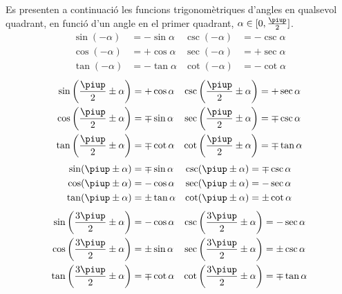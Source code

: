  Es presenten a continuació  les funcions trigonomètriques d'angles en qualsevol
quadrant, en funció d'un angle en el primer quadrant,
$\alpha\in[0,\frac{\piup}{2}]$.
\begin{subequations}
\begin{align}
    \sin(-\alpha) &= -\sin\alpha  & \csc(-\alpha) &= -\csc\alpha \\
    \cos(-\alpha) &= +\cos\alpha  & \sec(-\alpha) &= +\sec\alpha \\
    \tan(-\alpha) &= -\tan\alpha  & \cot(-\alpha) &= -\cot\alpha
\end{align}
\end{subequations}
\vspace{-5mm}
\begin{subequations}
\begin{align}
    \sin\left(\frac{\piup}{2}\pm\alpha\right) &= +\cos\alpha    & \csc\left(\frac{\piup}{2}\pm\alpha\right) &= +\sec\alpha \\
    \cos\left(\frac{\piup}{2}\pm\alpha\right) &= \mp\sin\alpha  & \sec\left(\frac{\piup}{2}\pm\alpha\right) &= \mp\csc\alpha \\
    \tan\left(\frac{\piup}{2}\pm\alpha\right) &= \mp\cot\alpha  & \cot\left(\frac{\piup}{2}\pm\alpha\right) &= \mp\tan\alpha
\end{align}
\end{subequations}
\vspace{-5mm}
\begin{subequations}
\begin{align}
    \sin(\piup\pm\alpha) &= \mp\sin\alpha  & \csc(\piup\pm\alpha) &= \mp\csc\alpha \\
    \cos(\piup\pm\alpha) &= -\cos\alpha    & \sec(\piup\pm\alpha) &= -\sec\alpha \\
    \tan(\piup\pm\alpha) &= \pm\tan\alpha  & \cot(\piup\pm\alpha) &= \pm\cot\alpha
\end{align}
\end{subequations}
\vspace{-5mm}
\begin{subequations}
\begin{align}
    \sin\left(\frac{3\piup}{2}\pm\alpha\right) &= -\cos\alpha    & \csc\left(\frac{3\piup}{2}\pm\alpha\right) &= -\sec\alpha \\
    \cos\left(\frac{3\piup}{2}\pm\alpha\right) &= \pm\sin\alpha  & \sec\left(\frac{3\piup}{2}\pm\alpha\right) &= \pm\csc\alpha \\
    \tan\left(\frac{3\piup}{2}\pm\alpha\right) &= \mp\cot\alpha  & \cot\left(\frac{3\piup}{2}\pm\alpha\right) &= \mp\tan\alpha
\end{align}
\end{subequations}
